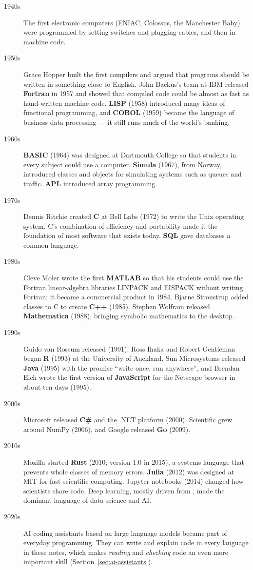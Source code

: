 \begin{description}
\item[1940s] The first electronic computers (ENIAC, Colossus, the Manchester Baby) were
  programmed by setting switches and plugging cables, and then in machine code.
\item[1950s] Grace Hopper built the first compilers and argued that programs should be
  written in something close to English. John Backus's team at IBM released
  \textbf{Fortran} in 1957 and showed that compiled code could be almost as fast as
  hand-written machine code. \textbf{LISP} (1958) introduced many ideas of functional
  programming, and \textbf{COBOL} (1959) became the language of business data
  processing --- it still runs much of the world's banking.
\item[1960s] \textbf{BASIC} (1964) was designed at Dartmouth College so that
  students in every subject could use a computer. \textbf{Simula} (1967), from Norway,
  introduced classes and objects for simulating systems such as queues and traffic.
  \textbf{APL} introduced array programming.
\item[1970s] Dennis Ritchie created \textbf{C} at Bell Labs (1972) to write the Unix
  operating system. C's combination of efficiency and portability made it the
  foundation of most software that exists today. \textbf{SQL} gave databases a common
  language.
\item[1980s] Cleve Moler wrote the first \textbf{MATLAB} so that his students could use
  the Fortran linear-algebra libraries LINPACK and EISPACK without writing Fortran; it
  became a commercial product in 1984. Bjarne Stroustrup added classes to C to create
  \textbf{C++} (1985). Stephen Wolfram released \textbf{Mathematica} (1988), bringing
  symbolic mathematics to the desktop.
\item[1990s] Guido van Rossum released \textbf{\py} (1991). Ross Ihaka and Robert
  Gentleman began \textbf{R} (1993) at the University of Auckland. Sun Microsystems
  released \textbf{Java} (1995) with the promise ``write once, run anywhere'', and
  Brendan Eich wrote the first version of \textbf{JavaScript} for the Netscape browser in
  about ten days (1995).
\item[2000s] Microsoft released \textbf{C\#} and the .NET platform (2000). Scientific
  \py grew around NumPy (2006), and Google released \textbf{Go} (2009).
\item[2010s] Mozilla started \textbf{Rust} (2010; version 1.0 in 2015), a systems
  language that prevents whole classes of memory errors. \textbf{Julia} (2012) was
  designed at MIT for fast scientific computing. Jupyter notebooks (2014) changed how
  scientists share code. Deep learning, mostly driven from \py, made \py the
  dominant language of data science and AI.
\item[2020s] AI coding assistants based on large language models became part of everyday
  programming. They can write and explain code in every language in these notes, which
  makes \emph{reading} and \emph{checking} code an even more important skill
  (Section~\ref{sec:ai-assistants}).
\end{description}

